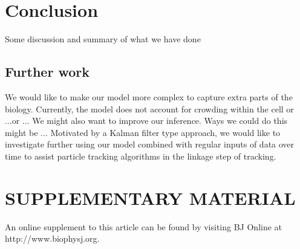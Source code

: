 \documentclass[twocolumn]{biophys}
\newcommand{\BibTeX}{\textsc{Bib}\TeX}       %
\begin{document}
\section{Conclusion}
Some discussion and summary of what we have done

\subsection{Further work}
We would like to make our model more complex to capture extra parts of the biology. 
Currently, the model does not account for crowding within the cell or ...or ...
We might also want to improve our inference. Ways we could do this might be ...
Motivated by a Kalman filter type approach, we would like to investigate further using our model combined with regular inputs of data over time to assist particle tracking algorithms in the linkage step of tracking.


\section*{SUPPLEMENTARY MATERIAL}

An online supplement to this article can be found by visiting BJ Online at http://www.biophysj.org.








%






\newpage

\listoffigures

\newpage

\listoftables


\end{document}
